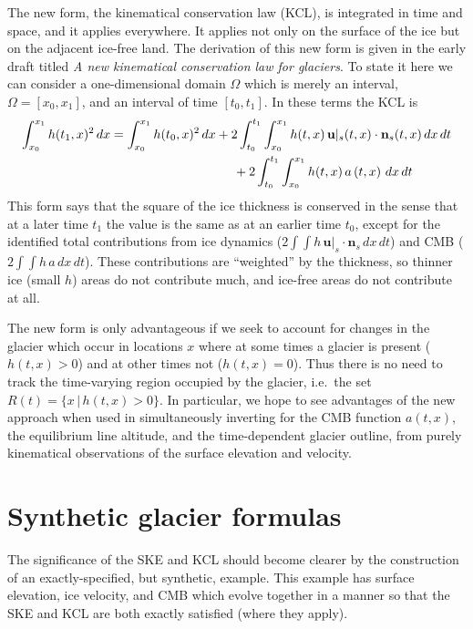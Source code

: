 \documentclass[letterpaper,final,12pt,reqno]{amsart}
\newcommand{\bn}{\mathbf{n}}
\newcommand{\bu}{\mathbf{u}}
\begin{document}
The new form, the kinematical conservation law (KCL), is integrated in time and space, and it applies everywhere.  It applies not only on the surface of the ice but on the adjacent ice-free land.  The derivation of this new form is given in the early draft titled \emph{A new kinematical conservation law for glaciers}.  To state it here we can consider a one-dimensional domain $\Omega$ which is merely an interval, $\Omega=[x_0,x_1]$, and an interval of time $[t_0,t_1]$.  In these terms the KCL is
\begin{align}
\int_{x_0}^{x_1} h(t_1,x)^2\,dx &= \int_{x_0}^{x_1} h(t_0,x)^2\,dx + 2 \int_{t_0}^{t_1} \int_{x_0}^{x_1} h(t,x)\, \bu|_s(t,x)\cdot \bn_s(t,x) \,dx\,dt \label{kcl} \\
  &\hspace{34mm} + 2 \int_{t_0}^{t_1} \int_{x_0}^{x_1} h(t,x)\, a\left(t,x\right) \,dx\,dt \notag
\end{align}
This form says that the square of the ice thickness is conserved in the sense that at a later time $t_1$ the value is the same as at an earlier time $t_0$, except for the identified total contributions from ice dynamics ($2 \int \int h\, \bu|_s \cdot \bn_s \,dx\,dt$) and CMB ($2 \int \int h\, a \,dx\,dt$).  These contributions are ``weighted'' by the thickness, so thinner ice (small $h$) areas do not contribute much, and ice-free areas do not contribute at all.

The new form is only advantageous if we seek to account for changes in the glacier which occur in locations $x$ where at some times a glacier is present ($h(t,x)>0$) and at other times not ($h(t,x)=0$).  Thus there is no need to track the time-varying region occupied by the glacier, i.e.~the set $R(t) = \{x\,|\,h(t,x)>0\}$.  In particular, we hope to see advantages of the new approach when used in simultaneously inverting for the CMB function $a(t,x)$, the equilibrium line altitude, and the time-dependent glacier outline, from purely kinematical observations of the surface elevation and velocity.


\section{Synthetic glacier formulas}

The significance of the SKE and KCL should become clearer by the construction of an exactly-specified, but synthetic, example.  This example has surface elevation, ice velocity, and CMB which evolve together in a manner so that the SKE and KCL are both exactly satisfied (where they apply).

%
%
\end{document}
